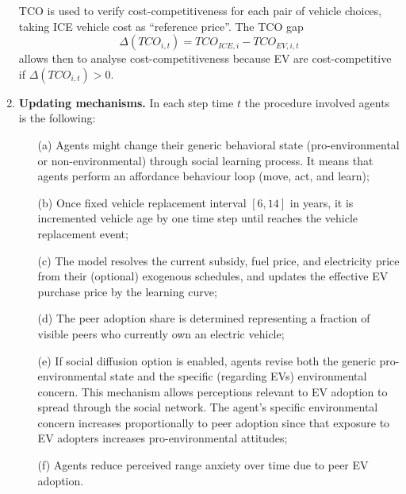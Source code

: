\documentclass[11pt]{article}
\begin{document}
\begin{enumerate}
  TCO is used to verify cost-competitiveness for each pair of vehicle
  choices, taking ICE vehicle cost as ``reference price''. The TCO gap
  \begin{equation}
    \Delta(TCO_{i,t}) = TCO_{ICE,i} - TCO_{EV,i,t}
  \end{equation}
  allows then to analyse cost-competitiveness because EV are cost-competitive
  if $\Delta(TCO_{i,t})>0$.

\item \textbf{Updating mechanisms.}
  In each step time $t$ the procedure involved agents is the following:
  \begin{enumerate}
  \item[(a)] Agents might change their generic behavioral state
    (pro-environmental or non-environmental) through social learning
    process. It means that agents perform an affordance behaviour loop
    (move, act, and learn);
  \item[(b)] Once fixed vehicle replacement interval $[6,14]$ in years, it
    is incremented vehicle age by one time step until reaches the vehicle
    replacement event;
  \item[(c)] The model resolves the current subsidy, fuel price, and
    electricity price from their (optional) exogenous schedules, and
    updates the effective EV purchase price by the learning curve;
  \item[(d)] The peer adoption share is determined representing a fraction
    of visible peers who currently own an electric vehicle;
  \item[(e)] If social diffusion option is enabled, agents revise both the
    generic pro-environmental state and the specific (regarding EVs)
    environmental concern. This mechanism allows perceptions relevant to EV
    adoption to spread through the social network. The agent's specific
    environmental concern increases proportionally to peer adoption since
    that exposure to EV adopters increases pro-environmental attitudes;
  \item[(f)] Agents reduce perceived range anxiety over time due to peer EV
    adoption.
  \end{enumerate}


\end{enumerate}
\end{document}
